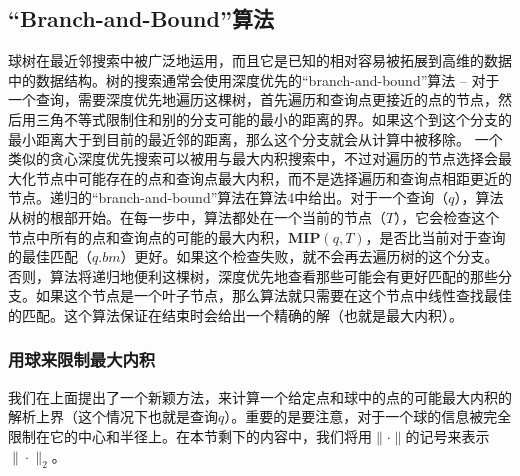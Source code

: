 \documentclass[twocolumn]{article}
\begin{document}
\subsection{“Branch-and-Bound”算法}

球树在最近邻搜索中被广泛地运用，而且它是已知的相对容易被拓展到高维的数据中的数据结构。树的搜索通常会使用深度优先的“branch-and-bound”算法 -- 对于一个查询，需要深度优先地遍历这棵树，首先遍历和查询点更接近的点的节点，然后用三角不等式限制住和别的分支可能的最小的距离的界。如果这个到这个分支的最小距离大于到目前的最近邻的距离，那么这个分支就会从计算中被移除。
一个类似的贪心深度优先搜索可以被用与最大内积搜索中，不过对遍历的节点选择会最大化节点中可能存在的点和查询点最大内积，而不是选择遍历和查询点相距更近的节点。递归的“branch-and-bound”算法在算法4中给出。对于一个查询（$q$），算法从树的根部开始。在每一步中，算法都处在一个当前的节点（$T$），它会检查这个节点中所有的点和查询点的可能的最大内积，$\mathbf{MIP}(q,T)$，是否比当前对于查询的最佳匹配（$q.bm$）更好。如果这个检查失败，就不会再去遍历树的这个分支。否则，算法将递归地便利这棵树，深度优先地查看那些可能会有更好匹配的那些分支。如果这个节点是一个叶子节点，那么算法就只需要在这个节点中线性查找最佳的匹配。这个算法保证在结束时会给出一个精确的解（也就是最大内积）。

\subsubsection{用球来限制最大内积}

我们在上面提出了一个新颖方法，来计算一个给定点和球中的点的可能最大内积的解析上界（这个情况下也就是查询$q$）。重要的是要注意，对于一个球的信息被完全限制在它的中心和半径上。在本节剩下的内容中，我们将用$\|\cdot\|$的记号来表示$\|\cdot\|_2$。
\end{document}

